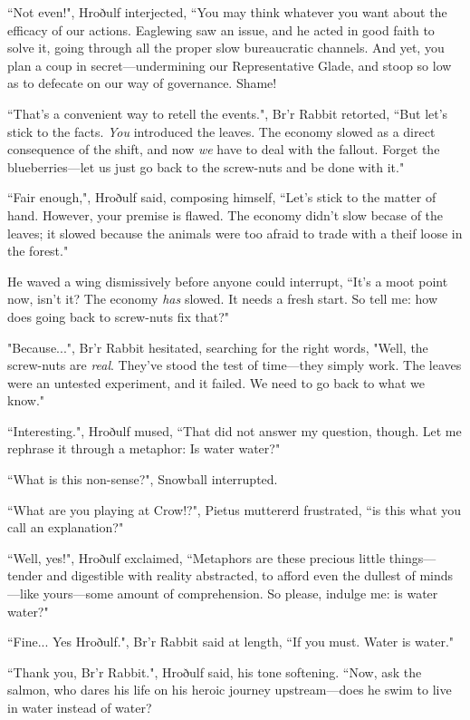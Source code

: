 ``Not even!", Hroðulf interjected, ``You may think whatever you want about the efficacy of our actions. Eaglewing saw an issue, and he acted in good faith to solve it, going through all the proper slow bureaucratic channels. And yet, you plan a coup in secret---undermining our Representative Glade, and stoop so low as to defecate on our way of governance. Shame!

``That's a convenient way to retell the events.", Br'r Rabbit retorted, ``But let's stick to the facts. \textit{You} introduced the leaves. The economy slowed as a direct consequence of the shift, and now \textit{we} have to deal with the fallout. Forget the blueberries---let us just go back to the screw-nuts and be done with it."

``Fair enough,", Hroðulf said, composing himself, ``Let's stick to the matter of hand. However, your premise is flawed. The economy didn't slow becase of the leaves; it slowed because the animals were too afraid to trade with a theif loose in the forest."

He waved a wing dismissively before anyone could interrupt, ``It's a moot point now, isn't it? The economy \textit{has} slowed. It needs a fresh start. So tell me: how does going back to screw-nuts fix that?"

"Because...", Br'r Rabbit hesitated, searching for the right words, "Well, the screw-nuts are \textit{real}. They've stood the test of time---they simply work. The leaves were an untested experiment, and it failed. We need to go back to what we know."

``Interesting.", Hroðulf mused, ``That did not answer my question, though. Let me rephrase it through a metaphor: Is water water?"

``What is this non-sense?", Snowball interrupted.

``What are you playing at Crow!?", Pietus muttererd frustrated, ``is this what you call an explanation?"

``Well, yes!", Hroðulf exclaimed, ``Metaphors are these precious little things---tender and digestible with reality abstracted, to afford even the dullest of minds---like yours---some amount of comprehension. So please, indulge me: is water water?"

``Fine... Yes Hroðulf.", Br'r Rabbit said at length, ``If you must. Water is water."

``Thank you, Br'r Rabbit.", Hroðulf said, his tone softening. ``Now, ask the salmon, who dares his life on his heroic journey upstream---does he swim to live in water instead of water?\\

